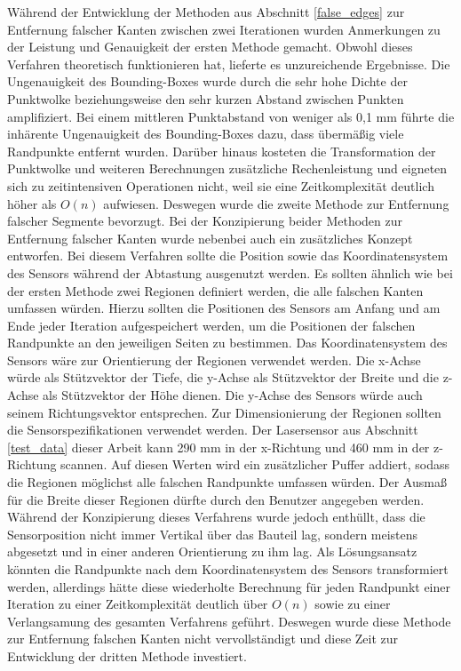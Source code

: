 Während der Entwicklung der Methoden aus Abschnitt \ref{false_edges} zur Entfernung falscher Kanten zwischen zwei Iterationen wurden Anmerkungen zu der Leistung und Genauigkeit der ersten Methode gemacht. Obwohl dieses Verfahren theoretisch funktionieren hat, lieferte es unzureichende Ergebnisse. Die Ungenauigkeit des Bounding-Boxes wurde durch die sehr hohe Dichte der Punktwolke beziehungsweise den sehr kurzen Abstand zwischen Punkten amplifiziert. Bei einem mittleren Punktabstand von weniger als 0,1 mm führte die inhärente Ungenauigkeit des Bounding-Boxes dazu, dass übermäßig viele Randpunkte entfernt wurden. Darüber hinaus kosteten die Transformation der Punktwolke und weiteren Berechnungen zusätzliche Rechenleistung und eigneten sich zu zeitintensiven Operationen nicht, weil sie eine Zeitkomplexität deutlich höher als $O(n)$ aufwiesen. Deswegen wurde die zweite Methode zur Entfernung falscher Segmente bevorzugt. Bei der Konzipierung beider Methoden zur Entfernung falscher Kanten wurde nebenbei auch ein zusätzliches Konzept entworfen. Bei diesem Verfahren sollte die Position sowie das Koordinatensystem des Sensors während der Abtastung ausgenutzt werden. Es sollten ähnlich wie bei der ersten Methode zwei Regionen definiert werden, die alle falschen Kanten umfassen würden. Hierzu sollten die Positionen des Sensors am Anfang und am Ende jeder Iteration aufgespeichert werden, um die Positionen der falschen Randpunkte an den jeweiligen Seiten zu bestimmen. Das Koordinatensystem des Sensors wäre zur Orientierung der Regionen verwendet werden. Die x-Achse würde als Stützvektor der Tiefe, die y-Achse als Stützvektor der Breite und die z-Achse als Stützvektor der Höhe dienen. Die y-Achse des Sensors würde auch seinem Richtungsvektor entsprechen. Zur Dimensionierung der Regionen sollten die Sensorspezifikationen verwendet werden. Der Lasersensor aus Abschnitt \ref{test_data} dieser Arbeit kann 290 mm in der x-Richtung und 460 mm in der z-Richtung scannen. Auf diesen Werten wird ein zusätzlicher Puffer addiert, sodass die Regionen möglichst alle falschen Randpunkte umfassen würden. Der Ausmaß für die Breite dieser Regionen dürfte durch den Benutzer angegeben werden. Während der Konzipierung dieses Verfahrens wurde jedoch enthüllt, dass die Sensorposition nicht immer Vertikal über das Bauteil lag, sondern meistens abgesetzt und in einer anderen Orientierung zu ihm lag. Als Lösungsansatz könnten die Randpunkte nach dem Koordinatensystem des Sensors transformiert werden, allerdings hätte diese wiederholte Berechnung für jeden Randpunkt einer Iteration zu einer Zeitkomplexität deutlich über $O(n)$ sowie zu einer Verlangsamung des gesamten Verfahrens geführt. Deswegen wurde diese Methode zur Entfernung falschen Kanten nicht vervollständigt und diese Zeit zur Entwicklung der dritten Methode investiert. 

